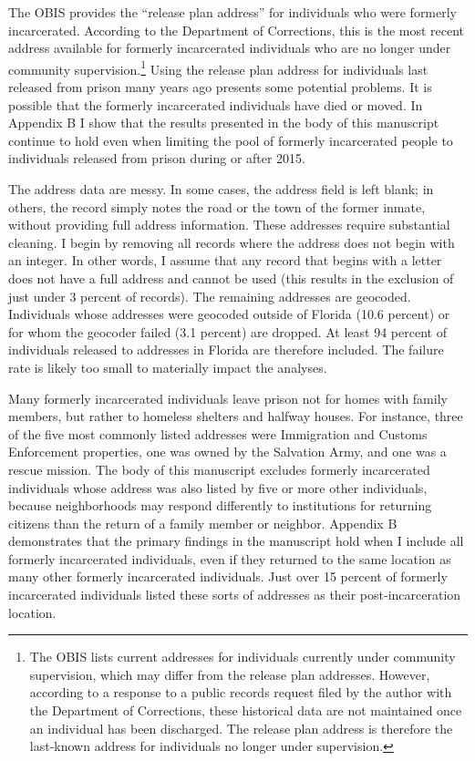 \documentclass[
  12pt,
]{article}
\begin{document}
The OBIS provides the ``release plan address'' for individuals who were formerly incarcerated. According to the Department of Corrections, this is the most recent address available for formerly incarcerated individuals who are no longer under community supervision.\footnote{The OBIS lists current addresses for individuals currently under community supervision, which may differ from the release plan addresses. However, according to a response to a public records request filed by the author with the Department of Corrections, these historical data are not maintained once an individual has been discharged. The release plan address is therefore the last-known address for individuals no longer under supervision.} Using the release plan address for individuals last released from prison many years ago presents some potential problems. It is possible that the formerly incarcerated individuals have died or moved. In Appendix B I show that the results presented in the body of this manuscript continue to hold even when limiting the pool of formerly incarcerated people to individuals released from prison during or after 2015.

The address data are messy. In some cases, the address field is left blank; in others, the record simply notes the road or the town of the former inmate, without providing full address information. These addresses require substantial cleaning. I begin by removing all records where the address does not begin with an integer. In other words, I assume that any record that begins with a letter does not have a full address and cannot be used (this results in the exclusion of just under 3 percent of records). The remaining addresses are geocoded. Individuals whose addresses were geocoded outside of Florida (10.6 percent) or for whom the geocoder failed (3.1 percent) are dropped. At least 94 percent of individuals released to addresses in Florida are therefore included. The failure rate is likely too small to materially impact the analyses.

Many formerly incarcerated individuals leave prison not for homes with family members, but rather to homeless shelters and halfway houses. For instance, three of the five most commonly listed addresses were Immigration and Customs Enforcement properties, one was owned by the Salvation Army, and one was a rescue mission. The body of this manuscript excludes formerly incarcerated individuals whose address was also listed by five or more other individuals, because neighborhoods may respond differently to institutions for returning citizens than the return of a family member or neighbor. Appendix B demonstrates that the primary findings in the manuscript hold when I include all formerly incarcerated individuals, even if they returned to the same location as many other formerly incarcerated individuals. Just over 15 percent of formerly incarcerated individuals listed these sorts of addresses as their post-incarceration location.
\end{document}
